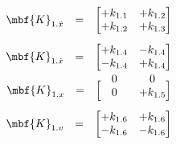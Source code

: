 \documentclass[crop=false,float=true,class=scrreprt]{standalone}
\begin{document}
\vspace{-0em}




\begin{gather}
\begin{array}{ccc}
\mbf{K}_{1.\ddot{x}}
& = &
\begin{bmatrix}
+k_{1.1} & +k_{1.2} \\
+k_{1.2} & +k_{1.3} \\
\end{bmatrix}
\end{array}
\\[+0.5em]
\begin{array}{ccc}
\mbf{K}_{1.\dot{x}}
& = &
\begin{bmatrix}
+k_{1.4} & -k_{1.4} \\
-k_{1.4} & +k_{1.4} \\
\end{bmatrix}
\end{array}
\\[+0.5em]
\begin{array}{ccc}
\mbf{K}_{1.x}
& = &
\begin{bmatrix}
\hphantom{+k_{1.5}} & \\[-2em]
0 & 0        \\
0 & +k_{1.5} \\
\end{bmatrix}
\end{array}
\\[+0.5em]
\begin{array}{ccc}
\mbf{K}_{1.v}
& = &
\begin{bmatrix}
+k_{1.6} & +k_{1.6} \\
-k_{1.6} & -k_{1.6} \\
\end{bmatrix}
\end{array}
\end{gather}




\vspace{-1em}
\end{document}
